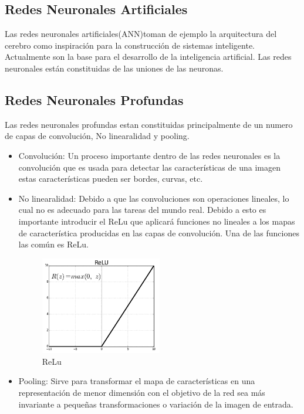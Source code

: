 \subsection{Redes Neuronales Artificiales}
Las redes neuronales artificiales(ANN)toman de ejemplo la arquitectura del cerebro como inspiración para la construcción de sistemas inteligente. Actualmente son la base para el desarrollo de la inteligencia artificial. Las redes neuronales están constituidas de las uniones de las neuronas.

\subsection{Redes Neuronales Profundas}


Las redes neuronales profundas estan constituidas principalmente de un numero de capas de convolución, No linearalidad y pooling.
\begin{itemize}
	\item Convolución:
	Un proceso importante dentro de las redes neuronales es la convolución que es usada para detectar las características de una imagen estas características pueden ser bordes, curvas, etc.
	\item No linearalidad:
	Debido a que las convoluciones son operaciones lineales, lo cual no es adecuado para las tareas del mundo real. Debido a esto es importante introducir el ReLu que aplicará funciones no lineales a los mapas de característica producidas en las capas de convolución.
	Una de las funciones las común es ReLu.
	\begin{figure}[H]
		\centering
		\includegraphics[width=0.5\textwidth]{Figures/relu.png}
		\caption{ReLu}
		\label{ReLu}
	\end{figure}

	
	\item Pooling:
	Sirve para transformar el mapa de características en una representación de menor dimensión con el objetivo de la red sea más invariante a pequeñas transformaciones o variación de la imagen de entrada.
\end{itemize}

